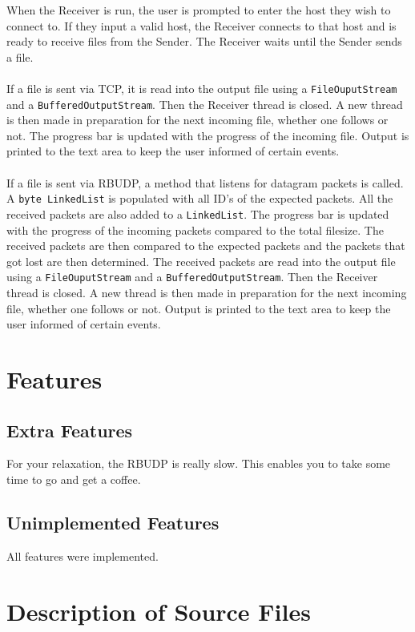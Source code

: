 \documentclass[13pt]{article}
\begin{document}
When the Receiver is run, the user is prompted to enter the host they wish to
connect to. If they input a valid host, the Receiver connects to that host and is
ready to receive files from the Sender. The Receiver waits until the Sender
sends a file.
\\\\
If a file is sent via TCP, it is read into the output file using a
\texttt{FileOuputStream} and a \texttt{BufferedOutputStream}. Then the Receiver thread
is closed. A new thread is then made in preparation for the next incoming file,
whether one follows or not. The progress bar is updated with the progress of the
incoming file. Output is printed to the text area to keep the user informed of
certain events.
\\\\
If a file is sent via RBUDP, a method that listens for datagram packets is called.
A \texttt{byte LinkedList} is populated with all ID's of the expected packets.
All the received packets are also added to a \texttt{LinkedList}. The progress bar
is updated with the progress of the incoming packets compared to the total filesize.
The received packets are then compared to the expected packets and the packets that got lost
are then determined. The received packets are read into the output file using a
\texttt{FileOuputStream} and a \texttt{BufferedOutputStream}. Then the Receiver thread
is closed. A new thread is then made in preparation for the next incoming file,
whether one follows or not. Output is printed to the text area to keep the user informed of
certain events.

\section{Features}

\subsection{Extra Features}

For your relaxation, the RBUDP is really slow. This enables you to take some time
to go and get a coffee.

\subsection{Unimplemented Features}

All features were implemented.

\section{Description of Source Files}
\end{document}
